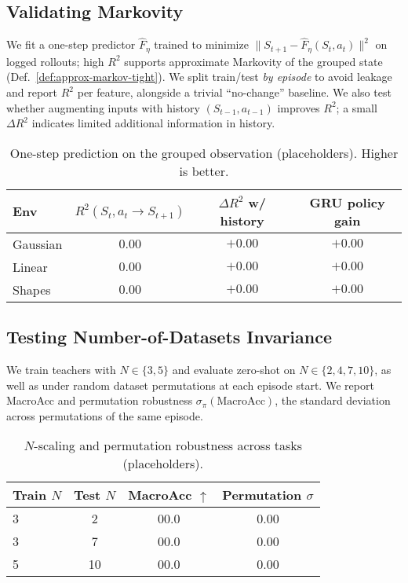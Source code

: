 \documentclass[11pt]{article}
\newcommand{\MacroAcc}{\mathrm{MacroAcc}}
\newcommand{\1}{\mathbf{1}}
\begin{document}
\subsection{Validating Markovity}\label{sec:markov-exp}
We fit a one-step predictor $\hat{F}_\eta$ trained to minimize $\|S_{t+1}-\hat{F}_\eta(S_t,a_t)\|^2$ on logged rollouts; high $R^2$ supports approximate Markovity of the grouped state (Def.~\ref{def:approx-markov-tight}).
We split train/test \emph{by episode} to avoid leakage and report $R^2$ per feature, alongside a trivial ``no-change'' baseline.
We also test whether augmenting inputs with history $(S_{t-1},a_{t-1})$ improves $R^2$; a small $\Delta R^2$ indicates limited additional information in history.
\begin{table}[H]
\centering
\caption{One-step prediction on the grouped observation (placeholders). Higher is better.}
\label{tab:markov}
\begin{tabular}{lccc}
\toprule
Env & $R^2(S_t,a_t\!\to\!S_{t+1})$ & $\Delta R^2$ w/ history & GRU policy gain \\
\midrule
Gaussian & $0.00$ & $+0.00$ & $+0.00$ \\
Linear & $0.00$ & $+0.00$ & $+0.00$ \\
Shapes & $0.00$ & $+0.00$ & $+0.00$ \\
\bottomrule
\end{tabular}
\end{table}

\subsection{Testing Number-of-Datasets Invariance}
We train teachers with $N\in\{3,5\}$ and evaluate zero-shot on $N\in\{2,4,7,10\}$, as well as under random dataset permutations at each episode start.
We report MacroAcc and permutation robustness $\sigma_\pi(\MacroAcc)$, the standard deviation across permutations of the same episode.
\begin{table}[H]
\centering
\caption{$N$-scaling and permutation robustness across tasks (placeholders).}
\label{tab:ninvariance}
\begin{tabular}{lccc}
\toprule
Train $N$ & Test $N$ & MacroAcc $\uparrow$ & Permutation $\sigma$ \\
\midrule
3 & 2 & 00.0 & 0.00 \\
3 & 7 & 00.0 & 0.00 \\
5 & 10 & 00.0 & 0.00 \\
\bottomrule
\end{tabular}
\end{table}
\end{document}
